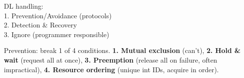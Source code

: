 DL handling:\\
1. Prevention/Avoidance (protocols)\\
2. Detection \& Recovery\\
3. Ignore (programmer responsible) 

Prevention: break 1 of 4 conditions. \textbf{1. Mutual exclusion} (can't), \textbf{2. Hold \& wait} (request all at once), \textbf{3. Preemption} (release all on failure, often impractical), \textbf{4. Resource ordering} (unique int IDs, acquire in order).
